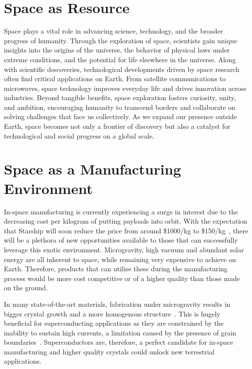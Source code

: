 \section{Space as Resource}
Space plays a vital role in advancing science, technology, and the broader progress of humanity. Through the exploration of space, scientists gain unique insights into the origins of the universe, the behavior of physical laws under extreme conditions, and the potential for life elsewhere in the universe. Along with scientific descoveries, technological developments driven by space research often find critical applications on Earth. From satellite communications to microwaves, space technology improves everyday life and drives innovation across industries. Beyond tangible benefits, space exploration fosters curiosity, unity, and ambition, encouraging humanity to transcend borders and collaborate on solving challenges that face us collectively. As we expand our presence outside Earth, space becomes not only a frontier of discovery but also a catalyst for technological and social progress on a global scale.

\section{Space as a Manufacturing Environment}
In-space manufacturing is currently experiencing a surge in interest due to the decreasing cost per kilogram of putting payloads into orbit. With the expectation that Starship will soon reduce the price from around \$1000/kg to \$150/kg~\cite{nextbigfuture2024spacex}, there will be a plethora of new opportunities available to those that can successfully leverage this exotic environment. Microgravity, high vacuum and abundant solar energy are all inherent to space, while remaining very expensive to achieve on Earth. Therefore, products that can utilise these during the manufacturing process would be more cost competitive or of a higher quality than those made on the ground.

In many state-of-the-art materials, fabrication under microgravity results in bigger crystal growth and a more homogenous structure~\cite{issnll_mccg}. This is hugely beneficial for superconducting applications as they are constrained by the inability to sustain high currents, a limitation caused by the presence of grain boundaries~\cite{hilgenkamp2002grain}. Superconductors are, therefore, a perfect candidate for in-space manufacturing and higher quality crystals could unlock new terrestrial applications.

